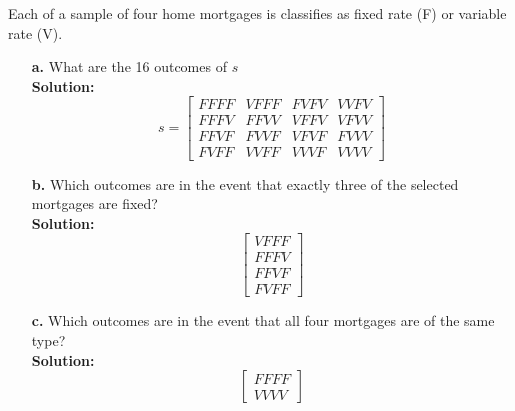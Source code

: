 \documentclass[12pt]{article}
\makeatletter
\theoremstyle{homework}
\newenvironment{exercise}[1]
{\def\@currentlabel{#1}\exercisecore}
{\endexercisecore}
\makeatother
\begin{document}
\begin{exercise}{2.4} Each of a sample of four home mortgages is classifies as fixed rate (F) or variable rate (V).\\

  \begin{enumerate}
    \item[\textbf{a.}] What are the 16 outcomes of $s$\\

    \textbf{Solution:}
    \begin{equation*}
    s = \begin{bmatrix}
      FFFF & VFFF & FVFV & VVFV\\
      FFFV & FFVV & VFFV & VFVV\\
      FFVF & FVVF & VFVF & FVVV\\
      FVFF & VVFF & VVVF & VVVV
    \end{bmatrix}
    \end{equation*}
    \vspace{.5in}

    
    
    
    
    \item[\textbf{b.}] Which outcomes are in the event that exactly three of the selected mortgages are fixed?\\
    
    \textbf{Solution:} 
    \begin{equation*}
     \begin{bmatrix}
        VFFF \\
        FFFV \\
        FFVF \\
        FVFF 
      \end{bmatrix}
      \end{equation*}
    \vspace{.5in}
    
    
    
    
    
    \item[\textbf{c.}] Which outcomes are in the event that all four mortgages are of the same type?\\
     
    \textbf{Solution:}
    \begin{equation*}
      \begin{bmatrix}
        FFFF \\
        VVVV
    \end{bmatrix}
    \end{equation*}
    \vspace{.5in}
    

\end{enumerate}
\end{exercise}
\end{document}
